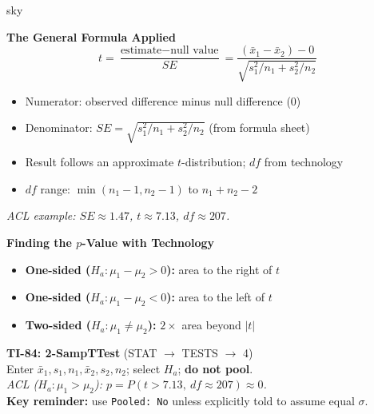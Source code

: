 \documentclass[10pt]{article}
\begin{document}
\begin{skillbox}{sky}
\begin{minipage}[t]{0.48\linewidth}
    \textbf{The General Formula Applied}
    \[
      t = \frac{\text{estimate} - \text{null value}}{SE}
        = \frac{(\bar x_1 - \bar x_2) - 0}{\sqrt{s_1^2/n_1 + s_2^2/n_2}}
    \]
    \begin{itemize}
        \item Numerator: observed difference minus null difference (0)
        \item Denominator: $SE = \sqrt{s_1^2/n_1 + s_2^2/n_2}$ (from formula sheet)
        \item Result follows an approximate $t$-distribution; $df$ from technology
        \item $df$ range: $\min(n_1-1, n_2-1)$ to $n_1+n_2-2$
    \end{itemize}
    \textit{ACL example: $SE \approx 1.47$, $t \approx 7.13$, $df \approx 207$.}
\end{minipage}
\hfill
\begin{minipage}[t]{0.48\linewidth}
    \textbf{Finding the $p$-Value with Technology}
    \begin{itemize}
        \item \textbf{One-sided ($H_a: \mu_1 - \mu_2 > 0$):} area to the right of $t$
        \item \textbf{One-sided ($H_a: \mu_1 - \mu_2 < 0$):} area to the left of $t$
        \item \textbf{Two-sided ($H_a: \mu_1 \ne \mu_2$):} $2 \times$ area beyond $|t|$
    \end{itemize}
    \textbf{TI-84: 2-SampTTest} (STAT $\to$ TESTS $\to$ 4)\\
    Enter $\bar x_1, s_1, n_1, \bar x_2, s_2, n_2$; select $H_a$; \textbf{do not pool}.\\[4pt]
    \textit{ACL ($H_a: \mu_1 > \mu_2$): $p = P(t > 7.13,\ df \approx 207) \approx 0$.}\\[4pt]
    \textbf{Key reminder:} use \texttt{Pooled: No} unless explicitly told to assume equal $\sigma$.
\end{minipage}
\end{skillbox}
\end{document}

